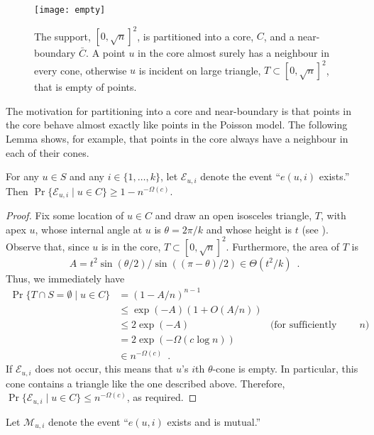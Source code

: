 \documentclass{patmorin}
\begin{document}
\begin{figure}
  \begin{center}
    \texttt{[image: empty]}
  \end{center}
  \caption{The support, $[0,\sqrt{n}]^2$, is partitioned into a core, $C$,
    and a near-boundary $\bar{C}$.  A point $u$ in the core almost surely
    has a neighbour in every cone, otherwise $u$ is incident on large
    triangle, $T\subset [0,\sqrt{n}]^2$, that is empty of points.}
\end{figure}

The motivation for partitioning into a core and near-boundary is that
points in the core behave almost exactly like points in the Poisson model.
The following Lemma shows, for example, that points in the core always
have a neighbour in each of their cones.

\newcommand{\eui}{\mathcal{E}_{u,i}}

\begin{lem}
  For any $u\in S$ and any $i\in\{1,\ldots,k\}$, let $\eui$ denote
  the event ``$e(u,i)$ exists.''  Then $\Pr\{\eui\mid u\in C\} \ge
  1-n^{-\Omega(c)}$.
\end{lem}

\begin{proof}
  Fix some location of $u\in C$ and draw an open isosceles triangle,
  $T$, with apex $u$, whose internal angle at $u$ is $\theta=2\pi/k$
  and whose height is $t$ (see ).  Observe that, since $u$
  is in the core, $T\subset [0,\sqrt{n}]^2$.  Furthermore, the area of $T$
  is 
  \[ 
     A = t^2\sin(\theta/2)/\sin((\pi-\theta)/2)\in \Theta(t^2/k) \enspace .
  \]
  Thus, we immediately have
  \begin{align*}
    \Pr\{T\cap S=\emptyset\mid u\in C\} 
       & = (1-A/n)^{n-1} \\
       & \le \exp(-A)(1+O(A/n)) \\
       & \le 2\exp(-A) & \text{(for sufficiently large $n$)}\\
       & = 2\exp(-\Omega(c\log n)) \\
       & \in n^{-\Omega(c)} \enspace .
  \end{align*}
  If $\eui$ does not occur, this means that $u$'s $i$th $\theta$-cone
  is empty. In particular, this cone contains a triangle like the one
  described above. Therefore, $\Pr\{\eui\mid u\in C\}\le n^{-\Omega(c)}$, as required.
\end{proof}

\newcommand{\mui}{\mathcal{M}_{u,i}}
Let $\mui$ denote the event ``$e(u,i)$ exists and is mutual.''
\end{document}
